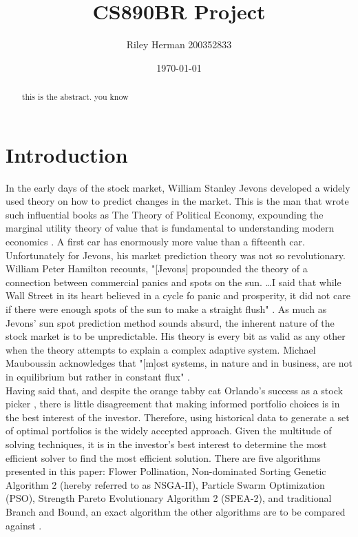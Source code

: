 \documentclass{article}
\title{CS890BR Project}
\date{\today}
\author{Riley Herman 200352833}
\begin{document}
    \maketitle
    \begin{abstract}
        this is the abstract. you know
    \end{abstract}
    \newpage
    \section{Introduction}
    In the early days of the stock market, William Stanley Jevons developed a widely used theory on how to predict changes in the market.
    This is the man that wrote such influential books as The Theory of Political Economy, expounding the marginal utility theory of value that 
    is fundamental to understanding modern economics \cite{Jevons}. A first car has enormously more value than a fifteenth car. Unfortunately for Jevons, 
    his market prediction theory was not so revolutionary. William Peter Hamilton recounts, "[Jevons] propounded the theory of a connection between 
    commercial panics and spots on the sun. \ldots I said that while Wall Street in its heart believed in a cycle fo panic and prosperity, 
    it did not care if there were enough spots of the sun to make a straight flush" \cite{Hamilton}. As much as Jevons' sun spot prediction method
    sounds absurd, the inherent nature of the stock market is to be unpredictable. His theory is every bit as valid as any other when the theory 
    attempts to explain a complex adaptive system. Michael Mauboussin acknowledges that "[m]ost systems, in nature and in business,
    are not in equilibrium but rather in constant flux" \cite{Mauboussin}. \\
    Having said that, and despite the orange tabby cat Orlando's success as a stock picker \cite{King}, there is little disagreement that making
    informed portfolio choices is in the best interest of the investor. Therefore, using historical data to generate a set of optimal portfolios
    is the widely accepted approach. Given the multitude of solving techniques, it is in the investor's best interest to determine the most efficient solver
    to find the most efficient solution. There are five algorithms presented in this paper: Flower Pollination, Non-dominated Sorting Genetic 
    Algorithm 2 (hereby referred to as NSGA-II), Particle Swarm Optimization (PSO), Strength Pareto Evolutionary Algorithm 2 (SPEA-2), and traditional
    Branch and Bound, an exact algorithm the other algorithms are to be compared against \cite{Yang} \cite{KaucicMoradiMirzazadeh} \cite{Guerard}. 
\end{document}
